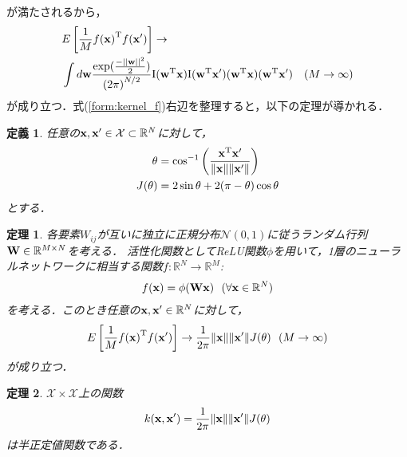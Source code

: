\documentclass[11pt,a4j]{article}
\newtheorem{dfn}{定義}
\newtheorem{thm}{定理}
\begin{document}
      が満たされるから，
      \begin{align}
        &E\left[ \frac{1}{M} {f({\bf x})}^{\mathrm{T}} f({\bf x}') \right] \to \nonumber \\
        &\int d{\bf w} \frac{\exp (\frac{- {|| {\bf w} ||}^2}{2})}{{(2 \pi)}^{N / 2}}
        {\mathrm{I}}( {\bf w}^{\mathrm{T}} {\bf x} ) {\mathrm{I}}( {\bf w}^{\mathrm{T}} {\bf x}' ) 
        ( {\bf w}^{\mathrm{T}} {\bf x} ) ( {\bf w}^{\mathrm{T}} {\bf x}' ) ~~~ (M \to \infty) \label{form:kernel_f} 
      \end{align}
      が成り立つ．式(\ref{form:kernel_f})右辺を整理すると，以下の定理が導かれる．

      \begin{dfn}
        任意の${\bf x}, {\bf x}' \in \mathcal{X} \subset \mathbb{R}^{N}$に対して，
        \begin{align}
          \theta &= {\cos}^{-1} \left( \frac{{\bf x}^{\mathrm{T}} {\bf x}'}{ \|{\bf x}\| \|{\bf x}'\| } \right) \\
          J(\theta) &= 2 \sin \theta + 2 (\pi - \theta) \cos \theta
        \end{align}
        とする．
      \end{dfn}

      \begin{thm}
        各要素$W_{ij}$が互いに独立に正規分布$\mathcal{N}(0, 1)$に従うランダム行列${\bf W} \in \mathbb{R}^{M \times N}$を考える．
        活性化関数としてReLU関数$\phi$を用いて，1層のニューラルネットワークに相当する関数$f:\mathbb{R}^{N} \to \mathbb{R}^{M}$:
        \begin{align}
          f({\bf x}) = \phi({\bf Wx}) ~~ (\forall {\bf x} \in \mathbb{R}^{N})
        \end{align}
        を考える．このとき任意の${\bf x}, {\bf x}' \in \mathbb{R}^{N}$に対して，
        \begin{align}
          E \left[ \frac{1}{M} {f({\bf x})}^{\mathrm{T}} f({\bf x}') \right] \to \frac{1}{2 \pi} \| {\bf x} \| \| {\bf x}' \| J(\theta) ~~ (M \to \infty)
        \end{align}
        が成り立つ．
      \end{thm}

      \begin{thm}
        $\mathcal{X} \times \mathcal{X}$上の関数
        \begin{align}
          k({\bf x},{\bf x}') = \frac{1}{2 \pi} \| {\bf x} \| \| {\bf x}' \| J(\theta)
        \end{align}
        は半正定値関数である．
      \end{thm}
\end{document}
